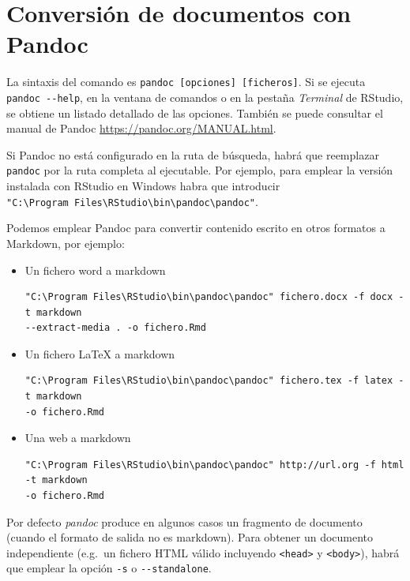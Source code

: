 \documentclass[]{book}
\theoremstyle{definition}
\theoremstyle{definition}
\theoremstyle{definition}
\theoremstyle{remark}
\begin{document}
\section{Conversión de documentos con Pandoc}\label{conversion}

La sintaxis del comando es
\texttt{pandoc\ {[}opciones{]}\ {[}ficheros{]}}. Si se ejecuta
\texttt{pandoc\ -\/-help}, en la ventana de comandos o en la pestaña
\emph{Terminal} de RStudio, se obtiene un listado detallado de las
opciones. También se puede consultar el manual de Pandoc
\url{https://pandoc.org/MANUAL.html}.

Si Pandoc no está configurado en la ruta de búsqueda, habrá que
reemplazar \texttt{pandoc} por la ruta completa al ejecutable. Por
ejemplo, para emplear la versión instalada con RStudio en Windows habra
que introducir
\texttt{"C:\textbackslash{}Program\ Files\textbackslash{}RStudio\textbackslash{}bin\textbackslash{}pandoc\textbackslash{}pandoc"}.

Podemos emplear Pandoc para convertir contenido escrito en otros
formatos a Markdown, por ejemplo:

\begin{itemize}
\item
  Un fichero word a markdown

\begin{verbatim}
"C:\Program Files\RStudio\bin\pandoc\pandoc" fichero.docx -f docx -t markdown 
--extract-media . -o fichero.Rmd 
\end{verbatim}
\item
  Un fichero LaTeX a markdown

\begin{verbatim}
"C:\Program Files\RStudio\bin\pandoc\pandoc" fichero.tex -f latex -t markdown 
-o fichero.Rmd 
\end{verbatim}
\item
  Una web a markdown

\begin{verbatim}
"C:\Program Files\RStudio\bin\pandoc\pandoc" http://url.org -f html -t markdown 
-o fichero.Rmd
\end{verbatim}
\end{itemize}

Por defecto \emph{pandoc} produce en algunos casos un fragmento de
documento (cuando el formato de salida no es markdown). Para obtener un
documento independiente (e.g.~un fichero HTML válido incluyendo
\texttt{\textless{}head\textgreater{}} y
\texttt{\textless{}body\textgreater{}}), habrá que emplear la opción
\texttt{-s} o \texttt{-\/-standalone}.
\end{document}
